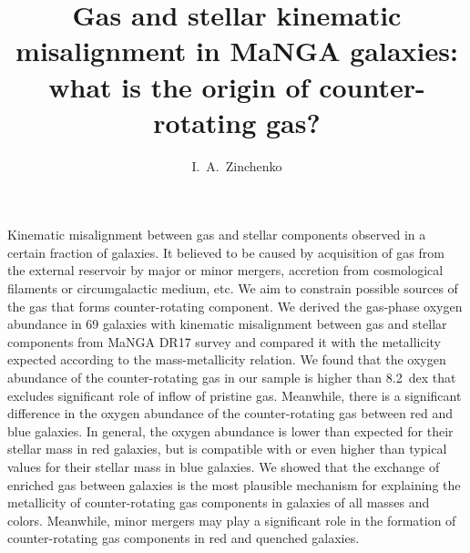 \documentclass[12pt,preprint]{aa}
\begin{document}
\title{Gas and stellar kinematic misalignment in MaNGA galaxies: what is the origin of counter-rotating gas?}

\author{
        I.~A.~Zinchenko\inst{\ref{LMU},\ref{MAO}}
       }
       


\abstract
   {Kinematic misalignment between gas and stellar components observed in a certain fraction of galaxies. It believed to be caused by acquisition of gas from the external reservoir by major or minor mergers, accretion from cosmological filaments or circumgalactic medium, etc. 
   }
   {We aim to constrain possible sources of the gas that forms counter-rotating component.}
   {We derived the gas-phase oxygen abundance in 69 galaxies with kinematic misalignment between gas and stellar components from MaNGA DR17 survey and compared it with the metallicity expected according to the mass-metallicity relation.}
   {We found that the oxygen abundance of the counter-rotating gas in our sample is higher than 8.2~dex that excludes significant role of inflow of pristine gas. Meanwhile, there is a significant difference in the oxygen abundance of the counter-rotating gas between red and blue galaxies. In general, the oxygen abundance is lower than expected for their stellar mass in red galaxies, but is compatible with or even higher than typical values for their stellar mass in blue galaxies.
   }
   {We showed that the exchange of enriched gas between galaxies is the most plausible mechanism for explaining the metallicity of counter-rotating gas components in galaxies of all masses and colors. Meanwhile, minor mergers may play a significant role in the formation of counter-rotating gas components in red and quenched galaxies.
   }


\maketitle
\end{document}
